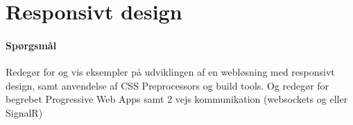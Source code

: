 \section{Responsivt design}

\paragraph{Spørgsmål}
Redegør for og vis eksempler på udviklingen af en webløsning med responsivt design, samt anvendelse af CSS Preprocessors og build tools. Og redegør for begrebet Progressive Web Apps samt 2 vejs kommunikation (websockets og eller SignalR)